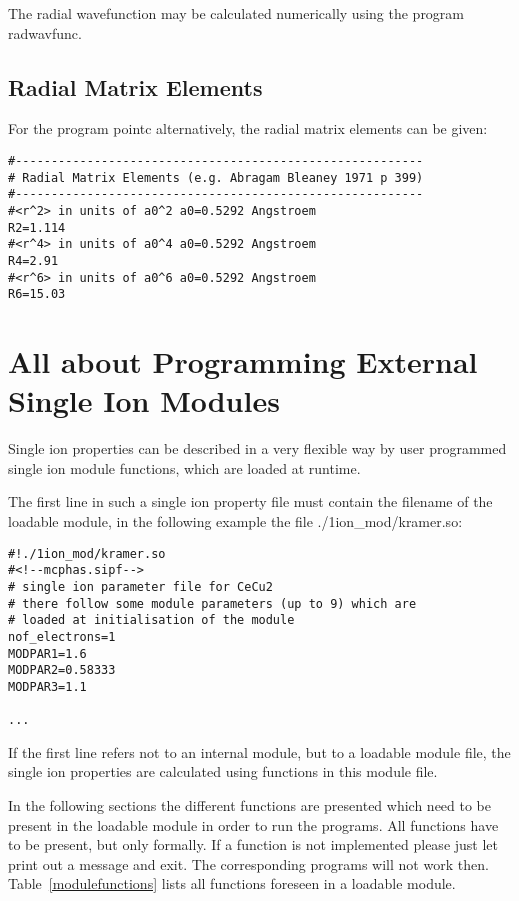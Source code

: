 The radial wavefunction may be calculated numerically using the program {\prg radwavfunc}.

\subsection{Radial Matrix Elements}

For the program {\prg pointc} alternatively, the radial matrix elements can be given:
{\footnotesize
\begin{verbatim}
#---------------------------------------------------------
# Radial Matrix Elements (e.g. Abragam Bleaney 1971 p 399)
#---------------------------------------------------------
#<r^2> in units of a0^2 a0=0.5292 Angstroem
R2=1.114
#<r^4> in units of a0^4 a0=0.5292 Angstroem
R4=2.91
#<r^6> in units of a0^6 a0=0.5292 Angstroem
R6=15.03
\end{verbatim}
}



\section{All about Programming External Single Ion Modules}\label{extsimod}

Single ion properties can be described in a very flexible way by
user programmed single ion module functions, which are loaded at runtime.

The first line in such a single ion property file
must contain the filename of the loadable module, in the following example
the file {\prg ./1ion\_mod/kramer.so}:

\begin{verbatim}
#!./1ion_mod/kramer.so
#<!--mcphas.sipf-->
# single ion parameter file for CeCu2
# there follow some module parameters (up to 9) which are 
# loaded at initialisation of the module
nof_electrons=1
MODPAR1=1.6
MODPAR2=0.58333
MODPAR3=1.1

...
\end{verbatim}


If the first line refers not to an internal module, but to
 a loadable module file, the single ion
properties are calculated using functions in this module file.

In the following sections the different functions are presented
which need to be present in the loadable module in order to 
run the programs. All functions have to be present, but only 
formally. If a function is not implemented please just let
print out a message and exit. The corresponding programs
will not work then. Table~\ref{modulefunctions} lists all
functions foreseen in a loadable module.

